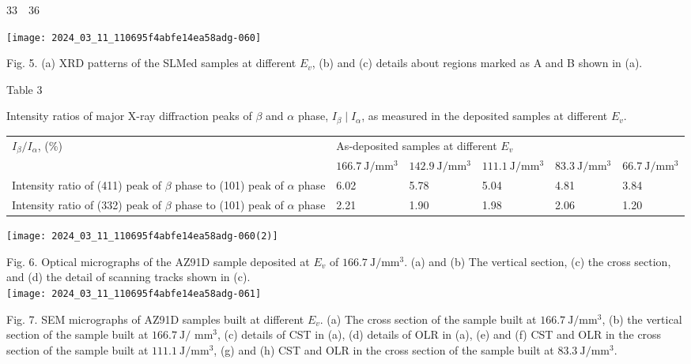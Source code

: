 \documentclass[10pt]{article}
\begin{document}
$33 \quad 36$

\begin{center}
\texttt{[image: 2024\_03\_11\_110695f4abfe14ea58adg-060]}
\end{center}

Fig. 5. (a) XRD patterns of the SLMed samples at different $E_{v}$, (b) and (c) details about regions marked as A and B shown in (a).

Table 3

Intensity ratios of major X-ray diffraction peaks of $\beta$ and $\alpha$ phase, $I_{\beta} \mid I_{\alpha}$, as measured in the deposited samples at different $E_{v}$.

\begin{center}
\begin{tabular}{llllll}
\hline
$I_{\beta} / I_{\alpha}$, (\%) & \multicolumn{4}{l}{As-deposited samples at different $E_{v}$} &  \\
\cline { 2 - 6 }
 & $166.7 \mathrm{~J} / \mathrm{mm}^{3}$ & $142.9 \mathrm{~J} / \mathrm{mm}^{3}$ & $111.1 \mathrm{~J} / \mathrm{mm}^{3}$ & $83.3 \mathrm{~J} / \mathrm{mm}^{3}$ & $66.7 \mathrm{~J} / \mathrm{mm}^{3}$ \\
\hline
Intensity ratio of (411) peak of $\beta$ phase to (101) peak of $\alpha$ phase & 6.02 & 5.78 & 5.04 & 4.81 & 3.84 \\
Intensity ratio of (332) peak of $\beta$ phase to (101) peak of $\alpha$ phase & 2.21 & 1.90 & 1.98 & 2.06 & 1.20 \\
\hline
\end{tabular}
\end{center}

\begin{center}
\texttt{[image: 2024\_03\_11\_110695f4abfe14ea58adg-060(2)]}
\end{center}

Fig. 6. Optical micrographs of the AZ91D sample deposited at $E_{v}$ of $166.7 \mathrm{~J} / \mathrm{mm}^{3}$. (a) and (b) The vertical section, (c) the cross section, and (d) the detail of scanning tracks shown in (c).\\
\texttt{[image: 2024\_03\_11\_110695f4abfe14ea58adg-061]}

Fig. 7. SEM micrographs of AZ91D samples built at different $E_{v}$. (a) The cross section of the sample built at $166.7 \mathrm{~J} / \mathrm{mm}^{3}$, (b) the vertical section of the sample built at $166.7 \mathrm{~J} /$ $\mathrm{mm}^{3}$, (c) details of CST in (a), (d) details of OLR in (a), (e) and (f) CST and OLR in the cross section of the sample built at $111.1 \mathrm{~J} / \mathrm{mm}^{3}$, (g) and (h) CST and OLR in the cross section of the sample built at $83.3 \mathrm{~J} / \mathrm{mm}^{3}$.
\end{document}
